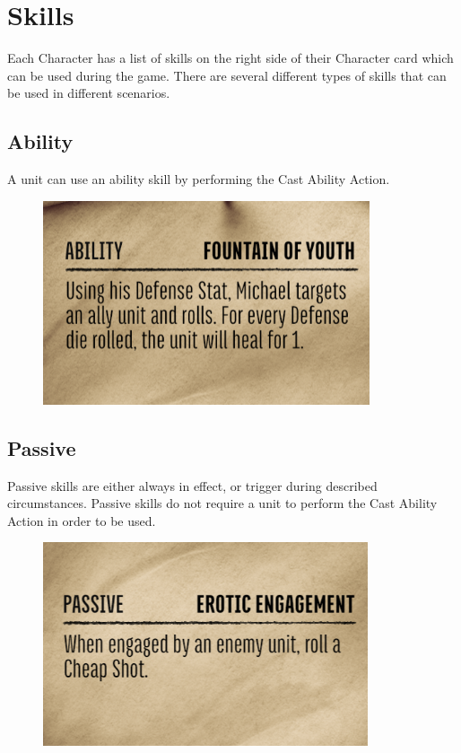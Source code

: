 \documentclass[../main.tex]{subfiles}
\begin{document}
\section{Skills}
Each Character has a list of skills on the right side of their Character card which can be used during the game. There are several different types of skills that can be used in different scenarios.

\subsection{Ability}
A unit can use an ability skill by performing the Cast Ability Action.

\begin{figure}[h]
    \centering
    \includegraphics[width=0.75\linewidth]{chapters//Skills/TimeStrikeAbilityGraphic.png}
\end{figure}

\subsection{Passive}
Passive skills are either always in effect, or trigger during described circumstances. Passive skills do not require a unit to perform the Cast Ability Action in order to be used.

\begin{figure}[h]
    \centering
    \includegraphics[width=0.75\linewidth]{chapters//Skills/TimeStrikePassiveGraphic.png}
\end{figure}
\end{document}
